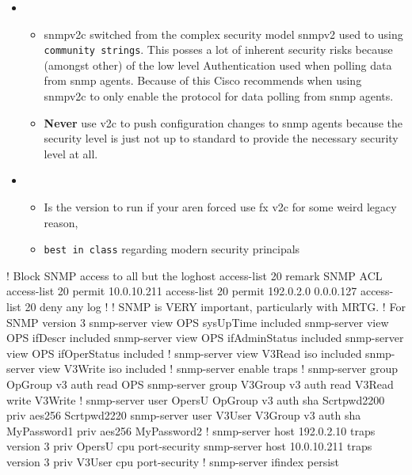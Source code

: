 \begin{itemize}
	\item {}
	\begin{itemize}
		\item \gls{snmp}v2c switched from the complex security model \gls{snmp}v2 used to using \texttt{community strings}. This posses a lot of inherent security risks because (amongst other) of the low level Authentication used when polling data from \gls{snmp} agents. Because of this Cisco recommends when using \gls{snmp}v2c to only enable the protocol for data polling from \gls{snmp} agents.
		\item \textbf{Never} use v2c to push configuration changes to \gls{snmp} agents because the security level is just not up to standard to provide the necessary security level at all.
	\end{itemize}
	\item {}
	\begin{itemize}
		\item Is the  version to run if your aren forced use fx v2c for some weird legacy reason,
		\item \texttt{best in class} regarding modern security principals
	\end{itemize}
\end{itemize}


\begin{cisco}
! Block SNMP access to all but the loghost
access-list 20 remark SNMP ACL
access-list 20 permit 10.0.10.211
access-list 20 permit 192.0.2.0 0.0.0.127
access-list 20 deny any log
!
! SNMP is VERY important, particularly with MRTG.
! For SNMP version 3
snmp-server view OPS sysUpTime included
snmp-server view OPS ifDescr included
snmp-server view OPS ifAdminStatus included
snmp-server view OPS ifOperStatus included
!
snmp-server view V3Read iso included
snmp-server view V3Write iso included
!
snmp-server enable traps
!
snmp-server group OpGroup v3 auth read OPS
snmp-server group V3Group v3 auth read V3Read write V3Write
!
snmp-server user OpersU OpGroup v3 auth sha Scrtpwd2200 priv aes256 Scrtpwd2220
snmp-server user V3User V3Group v3 auth sha MyPassword1 priv aes256 MyPassword2
!
snmp-server host 192.0.2.10 traps version 3 priv OpersU cpu port-security
snmp-server host 10.0.10.211 traps version 3 priv V3User cpu port-security
!
snmp-server ifindex persist
\end{cisco}

